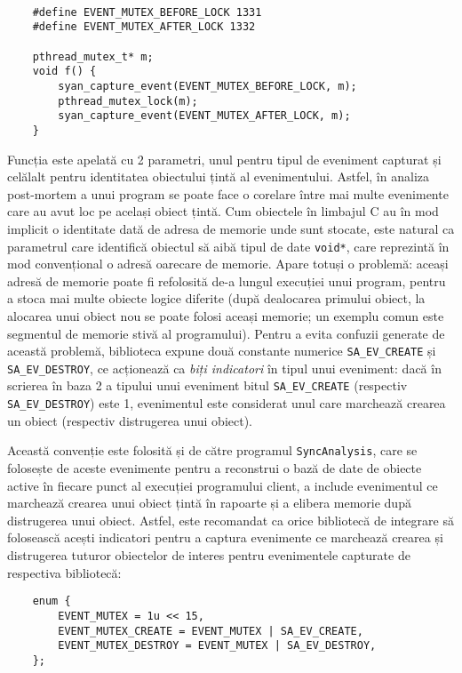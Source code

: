 \begin{lstlisting}[caption=Exemplul folosit în proiectarea interfeței,
                   label=code:library-interface-example]

    #define EVENT_MUTEX_BEFORE_LOCK 1331
    #define EVENT_MUTEX_AFTER_LOCK 1332

    pthread_mutex_t* m;
    void f() {
        syan_capture_event(EVENT_MUTEX_BEFORE_LOCK, m);
        pthread_mutex_lock(m);
        syan_capture_event(EVENT_MUTEX_AFTER_LOCK, m);
    }
\end{lstlisting}

Funcția este apelată cu 2 parametri, unul pentru tipul de eveniment
capturat și celălalt pentru identitatea obiectului țintă al
evenimentului. Astfel, în analiza post-mortem a unui program se poate
face o corelare între mai multe evenimente care au avut loc pe același
obiect țintă. Cum obiectele în limbajul C au în mod implicit o
identitate dată de adresa de memorie unde sunt stocate, este natural ca
parametrul care identifică obiectul să aibă tipul de date
\lstinline{void*}, care reprezintă în mod convențional o adresă oarecare
de memorie. Apare totuși o problemă: aceași adresă de memorie poate fi
refolosită de-a lungul execuției unui program, pentru a stoca mai multe
obiecte logice diferite (după dealocarea primului obiect, la alocarea
unui obiect nou se poate folosi aceași memorie; un exemplu comun este
segmentul de memorie stivă al programului). Pentru a evita confuzii
generate de această problemă, biblioteca expune două constante numerice
\lstinline{SA_EV_CREATE} și \lstinline{SA_EV_DESTROY}, ce acționează ca
\textit{biți indicatori} în tipul unui eveniment: dacă în scrierea în
baza 2 a tipului unui eveniment bitul \lstinline{SA_EV_CREATE}
(respectiv \lstinline{SA_EV_DESTROY}) este 1, evenimentul este
considerat unul care marchează crearea un obiect (respectiv distrugerea
unui obiect).

Această convenție este folosită și de către programul
\lstinline{SyncAnalysis}, care se folosește de aceste evenimente pentru
a reconstrui o bază de date de obiecte active în fiecare punct al
execuției programului client, a include evenimentul ce marchează
crearea unui obiect țintă în rapoarte și a elibera memorie după
distrugerea unui obiect. Astfel, este recomandat ca orice bibliotecă de
integrare să folosească acești indicatori pentru a captura evenimente ce
marchează crearea și distrugerea tuturor obiectelor de interes pentru
evenimentele capturate de respectiva bibliotecă:
\begin{lstlisting}
    enum {
        EVENT_MUTEX = 1u << 15,
        EVENT_MUTEX_CREATE = EVENT_MUTEX | SA_EV_CREATE,
        EVENT_MUTEX_DESTROY = EVENT_MUTEX | SA_EV_DESTROY,
    };
\end{lstlisting}

